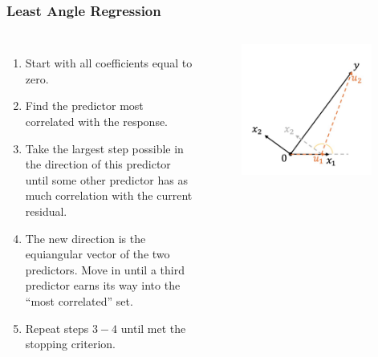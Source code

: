 \begin{frame}
\frametitle{Least Angle Regression}
\begin{columns}
    \begin{enumerate}
        \item Start with all coefficients equal to zero.
        \item Find the predictor most correlated with the response.
        \item Take the largest step possible in the direction of this predictor until some other predictor has as much correlation with the current residual.
        \item The new direction is the equiangular vector of the two predictors. Move in until a third predictor earns its way into the ``most correlated'' set.
        \item Repeat steps $3-4$ until met the stopping criterion.
    \end{enumerate}
    
    \begin{figure}[!htbp]
        \begin{center}
            \includegraphics[width=0.95\textwidth]{img/LAR/4.jpeg}
        \end{center}
    \end{figure}
\end{columns}
\end{frame}

